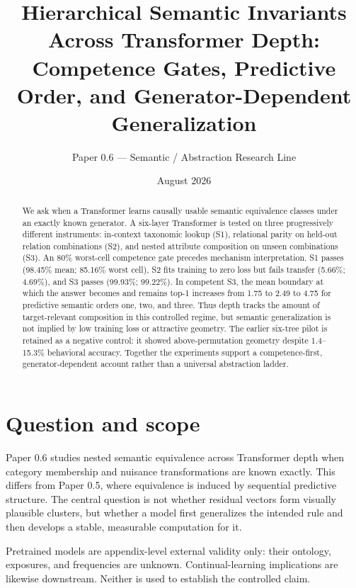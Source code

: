 \documentclass[10pt]{article}
\title{Hierarchical Semantic Invariants Across Transformer Depth:\\
Competence Gates, Predictive Order, and Generator-Dependent Generalization}
\author{Paper 0.6 --- Semantic / Abstraction Research Line}
\date{August 2026}
\begin{document}
\maketitle

\begin{abstract}
We ask when a Transformer learns causally usable semantic equivalence classes under an exactly known generator.  A six-layer Transformer is tested on three progressively different instruments: in-context taxonomic lookup (S1), relational parity on held-out relation combinations (S2), and nested attribute composition on unseen combinations (S3).  An 80\% worst-cell competence gate precedes mechanism interpretation.  S1 passes (98.45\% mean; 85.16\% worst cell), S2 fits training to zero loss but fails transfer (5.66\%; 4.69\%), and S3 passes (99.93\%; 99.22\%).  In competent S3, the mean boundary at which the answer becomes and remains top-1 increases from 1.75 to 2.49 to 4.75 for predictive semantic orders one, two, and three.  Thus depth tracks the amount of target-relevant composition in this controlled regime, but semantic generalization is not implied by low training loss or attractive geometry.  The earlier six-tree pilot is retained as a negative control: it showed above-permutation geometry despite 1.4--15.3\% behavioral accuracy.  Together the experiments support a competence-first, generator-dependent account rather than a universal abstraction ladder.
\end{abstract}

\section{Question and scope}
Paper 0.6 studies nested semantic equivalence across Transformer depth when category membership and nuisance transformations are known exactly.  This differs from Paper 0.5, where equivalence is induced by sequential predictive structure.  The central question is not whether residual vectors form visually plausible clusters, but whether a model first generalizes the intended rule and then develops a stable, measurable computation for it.

Pretrained models are appendix-level external validity only: their ontology, exposures, and frequencies are unknown.  Continual-learning implications are likewise downstream.  Neither is used to establish the controlled claim.
\end{document}
